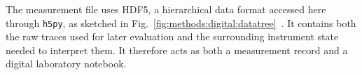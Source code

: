             The measurement file uses HDF5, a hierarchical data format accessed here through \texttt{h5py}, as sketched in Fig.~\ref{fig:methods:digital:datatree}~\cite{h5py_github,hdf5_github}. It contains both the raw traces used for later evaluation and the surrounding instrument state needed to interpret them. It therefore acts as both a measurement record and a digital laboratory notebook.

            \begin{figure}[t]
                \ttfamily\fontsize{7}{9}\selectfont
                \centering
                \setlength{\subfigcapskip}{0.8em}
                \hfill
                \hfill
\end{figure}
